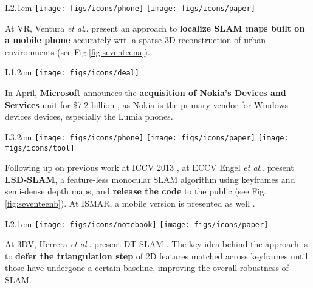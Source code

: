 \documentclass[12pt,a4paper]{article}
\makeatletter
\DeclareRobustCommand\onedot{\futurelet\@let@token\@onedot}
\def\@onedot{\ifx\@let@token.\else.\null\fi\xspace}
\def\etal{\emph{et al}\onedot}
\makeatother
\begin{document}
\vspace{0.1in}

\begin{wrapfigure}{L}{2.1cm}
	\vspace{-15pt}	
	\texttt{[image: figs/icons/phone]}
	\texttt{[image: figs/icons/paper]}
	\vspace{-25pt}		
\end{wrapfigure} 
\noindent At VR, Ventura \etal present an approach to \textbf{localize SLAM maps built on a mobile phone} accurately wrt. a sparse 3D reconstruction of urban environments \cite{Ventura14} (see Fig.\ref{fig:seventeena}).

\vspace{0.1in}

\begin{wrapfigure}{L}{1.2cm}
	\vspace{-0pt}	
	\texttt{[image: figs/icons/deal]}
	\vspace{-20pt}		
\end{wrapfigure} 
\noindent In April, \textbf{Microsoft} announces the \textbf{acquisition of Nokia's Devices and Services} unit for \$7.2 billion , as Nokia is the primary vendor for Windows devices devices, especially the Lumia phones.

\vspace{0.1in}

\begin{wrapfigure}{L}{3.2cm}
	\vspace{-15pt}	
	\texttt{[image: figs/icons/phone]}
	\texttt{[image: figs/icons/paper]}
	\texttt{[image: figs/icons/tool]}
	\vspace{-25pt}		
\end{wrapfigure} 
\noindent Following up on previous work at ICCV 2013 \cite{Engel13}, at ECCV Engel \etal present \textbf{LSD-SLAM}, a feature-less monocular SLAM algorithm using keyframes and semi-dense depth maps, and \textbf{release the code} to the public \cite{engel14eccv} (see Fig.\ref{fig:seventeenb}). At ISMAR, a mobile version is presented as well \cite{schoeps14ismar}.

\vspace{0.1in}

\begin{wrapfigure}{L}{2.1cm}
	\vspace{-10pt}	
	\texttt{[image: figs/icons/notebook]}
	\texttt{[image: figs/icons/paper]}
	\vspace{-25pt}		
\end{wrapfigure} 
\noindent At 3DV, Herrera \etal present DT-SLAM \cite{Herrera14}. The key idea behind the approach is to \textbf{defer the triangulation step} of  2D features matched across keyframes until those have undergone a certain baseline, improving the overall robustness of SLAM.
\end{document}
